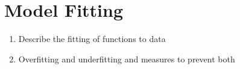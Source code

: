 \section{Model Fitting}\label{sec:models}

\begin{enumerate}
	\item Describe the fitting of functions to data
	\item Overfitting and underfitting and measures to prevent both
\end{enumerate}